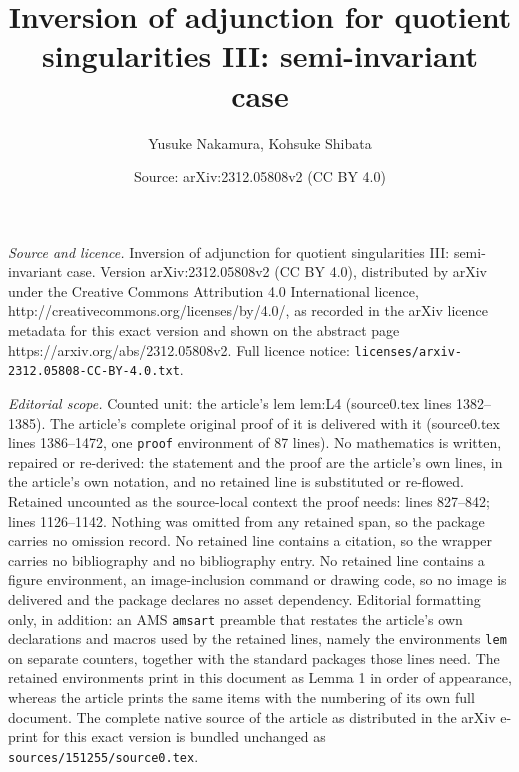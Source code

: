 \documentclass[10pt,a4paper]{amsart}
\title{Inversion of adjunction for quotient singularities III: semi-invariant case}
\author{Yusuke Nakamura, Kohsuke Shibata}
\date{Source: arXiv:2312.05808v2 (CC BY 4.0)}
\begin{document}
\maketitle

\noindent\emph{Source and licence.} Inversion of adjunction for quotient singularities III: semi-invariant case. Version arXiv:2312.05808v2 (CC BY 4.0), distributed by arXiv under the Creative Commons Attribution 4.0 International licence, http://creativecommons.org/licenses/by/4.0/, as recorded in the arXiv licence metadata for this exact version and shown on the abstract page https://arxiv.org/abs/2312.05808v2. Full licence notice: \texttt{licenses/arxiv-2312.05808-CC-BY-4.0.txt}.\par\smallskip

\noindent\textit{Editorial scope.} Counted unit: the article's lem lem:L4 (source0.tex lines 1382--1385). The article's complete original proof of it is delivered with it (source0.tex lines 1386--1472, one \texttt{proof} environment of 87 lines). No mathematics is written, repaired or re-derived: the statement and the proof are the article's own lines, in the article's own notation, and no retained line is substituted or re-flowed.  Retained uncounted as the source-local context the proof needs: lines 827--842; lines 1126--1142.  Nothing was omitted from any retained span, so the package carries no omission record.  No retained line contains a citation, so the wrapper carries no bibliography and no bibliography entry.  No retained line contains a figure environment, an image-inclusion command or drawing code, so no image is delivered and the package declares no asset dependency.  Editorial formatting only, in addition: an AMS \texttt{amsart} preamble that restates the article's own declarations and macros used by the retained lines, namely the environments \texttt{lem} on separate counters, together with the standard packages those lines need.  The retained environments print in this document as Lemma 1 in order of appearance, whereas the article prints the same items with the numbering of its own full document.  The complete native source of the article as distributed in the arXiv e-print for this exact version is bundled unchanged as \texttt{sources/151255/source0.tex}.
\end{document}
